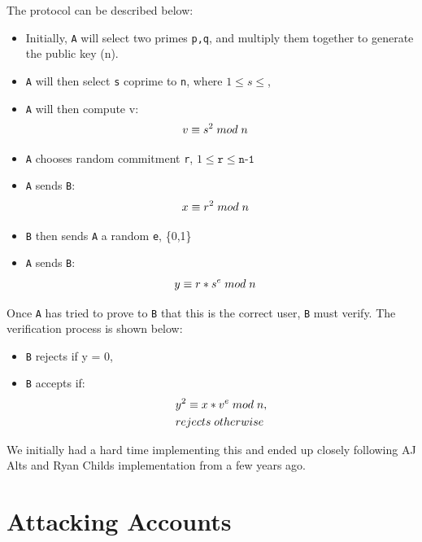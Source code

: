 \documentclass[10pt]{article}
\begin{document}
The protocol can be described below:
\begin{itemize}
    \item Initially, \texttt{A} will select two primes \texttt{p,q}, and multiply them together to generate the public key (n).
    \item \texttt{A} will then select \texttt{s} coprime to \texttt{n}, where $1 \leq s \leq$,
    \item \texttt{A} will then compute v:
        \begin{align*}
            v &\equiv s^{2} \thickspace mod \thickspace n
        \end{align*}
    \item \texttt{A} chooses random commitment \texttt{r}, $1 \leq \texttt{r} \leq \texttt{n-1}$
    \item \texttt{A} sends \texttt{B}:
        \begin{align*}
            x &\equiv r^{2} \thickspace mod \thickspace n
        \end{align*}
    \item \texttt{B} then sends \texttt{A} a random \texttt{e}, \{0,1\}
    \item \texttt{A} sends \texttt{B}:
        \begin{align*}
            y &\equiv r*s^{e} \thickspace mod \thickspace n
        \end{align*}
\end{itemize}
Once \texttt{A} has tried to prove to \texttt{B} that this is the correct user, \texttt{B} must verify.
The verification process is shown below:

\begin{itemize}
    \item \texttt{B} rejects if y = 0,
    \item \texttt{B} accepts if:
        \begin{align*}
            & y^{2} \equiv x*v^{e} \thickspace mod \thickspace n, \\
            & rejects \thickspace otherwise
        \end{align*}
\end{itemize}

We initially had a hard time implementing this and ended up closely following
AJ Alts and Ryan Childs implementation \cite{aj} from a few years ago.

\newpage
\section{Attacking Accounts}
\end{document}
